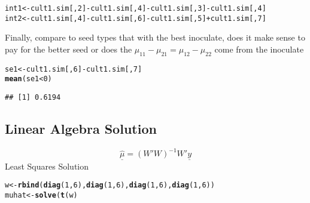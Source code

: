 \documentclass[12pt,letterpaper,oneside]{article}\usepackage{graphicx, color}
\makeatletter
\newcommand{\hlfunctioncall}[1]{\textcolor[rgb]{0.501960784313725,0,0.329411764705882}{\textbf{#1}}}%
\newenvironment{kframe}{%
 \def\at@end@of@kframe{}%
 \ifinner\ifhmode%
  \def\at@end@of@kframe{\end{minipage}}%
  \begin{minipage}{\columnwidth}%
 \fi\fi%
 \def\FrameCommand##1{\hskip\@totalleftmargin \hskip-\fboxsep
 \colorbox{shadecolor}{##1}\hskip-\fboxsep
     \hskip-\linewidth \hskip-\@totalleftmargin \hskip\columnwidth}%
 \MakeFramed {\advance\hsize-\width
   \@totalleftmargin\z@ \linewidth\hsize
   \@setminipage}}%
 {\par\unskip\endMakeFramed%
 \at@end@of@kframe}
\newenvironment{knitrout}{}{} %
\makeatother
\begin{document}
\begin{knitrout}\scriptsize
{}\color{fgcolor}\begin{kframe}
\begin{alltt}
int1 <- cult1.sim[, 2] - cult1.sim[, 4] - cult1.sim[, 3] - cult1.sim[, 4]
int2 <- cult1.sim[, 4] - cult1.sim[, 6] - cult1.sim[, 5] + cult1.sim[, 7]
\end{alltt}
\end{kframe}
\end{knitrout}


Finally, compare to seed types that with the best inoculate, does it make sense to pay for the better seed or does the $\mu_{11}-\mu_{21} = \mu_{12}-\mu_{22}$ come from the inoculate
\begin{knitrout}\scriptsize
{}\color{fgcolor}\begin{kframe}
\begin{alltt}
se1 <- cult1.sim[, 6] - cult1.sim[, 7]
\hlfunctioncall{mean}(se1 < 0)
\end{alltt}
\begin{verbatim}
## [1] 0.6194
\end{verbatim}
\end{kframe}
\end{knitrout}

\subsection{Linear Algebra Solution} %
\label{sec:linear_algebra_solution}

\[
\underline{\hat{\mu}} = (W' W)^{-1} W' \underline{y}
\]
Least Squares Solution
\begin{knitrout}\scriptsize
{}\color{fgcolor}\begin{kframe}
\begin{alltt}
w <- \hlfunctioncall{rbind}(\hlfunctioncall{diag}(1, 6), \hlfunctioncall{diag}(1, 6), \hlfunctioncall{diag}(1, 6), \hlfunctioncall{diag}(1, 6))
muhat <- \hlfunctioncall{solve}(\hlfunctioncall{t}(w) %*% w) %*% \hlfunctioncall{t}(w) %*% twoway$yield
\end{alltt}
\end{kframe}
\end{knitrout}
\end{document}
